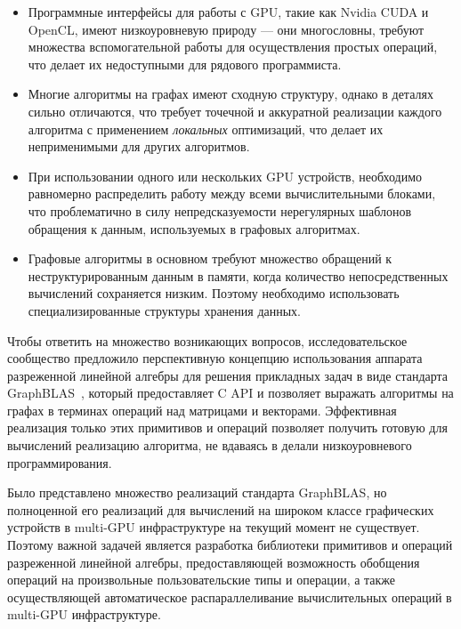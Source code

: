\begin{itemize}
    \item Программные интерфейсы для работы с GPU, такие как Nvidia CUDA и OpenCL, имеют низкоуровневую природу --- они многословны, требуют множества вспомогательной работы для осуществления простых операций, что делает их недоступными для рядового программиста.
   
    \item Многие алгоритмы на графах имеют сходную структуру, однако в деталях сильно отличаются, что требует точечной и аккуратной реализации каждого алгоритма с применением \textit{локальных} оптимизаций, что делает их неприменимыми для других алгоритмов.
   
    \item При использовании одного или нескольких GPU устройств, необходимо равномерно распределить работу между всеми вычислительными блоками, что проблематично в силу непредсказуемости нерегулярных шаблонов обращения к данным, используемых в графовых алгоритмах. 
   
    \item Графовые алгоритмы в основном требуют множество обращений к неструктурированным данным в памяти, когда количество непосредственных вычислений сохраняется низким. Поэтому необходимо использовать специализированные структуры хранения данных.
\end{itemize}

Чтобы ответить на множество возникающих вопросов, исследовательское сообщество предложило перспективную концепцию использования аппарата разреженной линейной алгебры для решения прикладных задач в виде стандарта GraphBLAS~\cite{paper:graphblas_foundations}, который предоставляет C API и позволяет выражать алгоритмы на графах в терминах операций над матрицами и векторами. Эффективная реализация только этих примитивов и операций позволяет получить готовую для вычислений реализацию алгоритма, не вдаваясь в делали низкоуровневого программирования.

Было представлено множество реализаций стандарта GraphBLAS, но полноценной его реализаций для вычислений на широком классе графических устройств в multi-GPU инфраструктуре на текущий момент не существует. Поэтому важной задачей является разработка библиотеки примитивов и операций разреженной линейной алгебры, предоставляющей возможность обобщения операций на произвольные пользовательские типы и операции, а также осуществляющей автоматическое распараллеливание вычислительных операций в multi-GPU инфраструктуре.   
